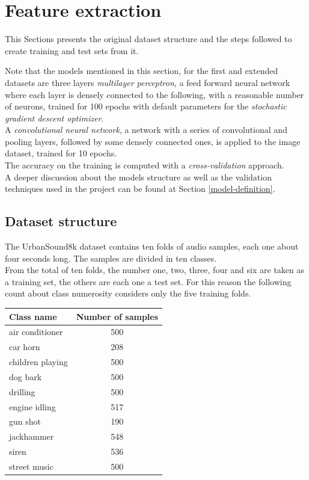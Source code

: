 \section{Feature extraction}
\label{feature-extraction}

This Sections presents the original dataset structure and the 
steps followed to create training and test sets from it.

Note that the models mentioned in this section, for the first and 
extended datasets are
three layers \emph{multilayer perceptron}, 
a feed forward neural network where each layer 
is densely connected  to the following, 
with a reasonable number of neurons, trained 
for 100 epochs with default parameters for the \emph{stochastic gradient 
descent optimizer}.~\cite{mlp}\cite{sgd}\\
A \emph{convolutional neural network}, a network with 
a series of convolutional and pooling layers, followed by 
some densely connected ones, is applied to the image dataset, trained for 10 epochs.~\cite{cnn} \\
The accuracy on the training is computed with a \emph{cross-validation} 
approach.~\cite{cross}\\

A deeper discussion about the models structure as well as the validation
techniques used in the project can be found at Section \vref{model-definition}.

\subsection{Dataset structure}
\label{dataset-structure}

The UrbanSound8k dataset contains ten folds of audio samples, each one about 
four seconds long. The samples are divided in ten classes.\\
From the total of ten folds, the number one, two, three, four and six 
are taken as a training set, the others are each one a test set.
For this reason the following count about class numerosity considers
only the five training folds.

\begin{center}
    \begin{tabular}{ |l|c| } 
        \hline
        Class name & Number of samples \\
        \hline
        air conditioner & 500 \\
        car horn & 208 \\
        children playing & 500 \\
        dog bark & 500 \\
        drilling & 500 \\
        engine idling & 517 \\
        gun shot & 190 \\
        jackhammer & 548 \\
        siren & 536 \\
        street music & 500 \\
        \hline
    \end{tabular}
\end{center}

